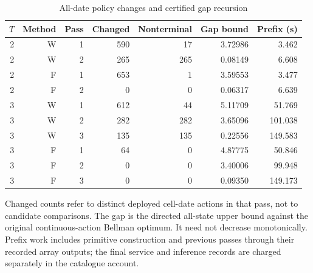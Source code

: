 \begin{table}[htbp]
\centering
\caption{All-date policy changes and certified gap recursion}\label{tab:sweeps54}
{\small\setlength{\tabcolsep}{4pt}
\begin{tabular}{rrr r r r r}
\hline
$T$ & Method & Pass & Changed & Nonterminal & Gap bound & Prefix (s) \\
\hline
2 & W & 1 & 590 & 17 & 3.72986 & 3.462 \\
2 & W & 2 & 265 & 265 & 0.08149 & 6.608 \\
2 & F & 1 & 653 & 1 & 3.59553 & 3.477 \\
2 & F & 2 & 0 & 0 & 0.06317 & 6.639 \\
3 & W & 1 & 612 & 44 & 5.11709 & 51.769 \\
3 & W & 2 & 282 & 282 & 3.65096 & 101.038 \\
3 & W & 3 & 135 & 135 & 0.22556 & 149.583 \\
3 & F & 1 & 64 & 0 & 4.87775 & 50.846 \\
3 & F & 2 & 0 & 0 & 3.40006 & 99.948 \\
3 & F & 3 & 0 & 0 & 0.09350 & 149.173 \\
\hline
\end{tabular}}
\par\smallskip
{\footnotesize Changed counts refer to distinct deployed cell-date actions in that pass, not to candidate comparisons. The gap is the directed all-state upper bound against the original continuous-action Bellman optimum. It need not decrease monotonically. Prefix work includes primitive construction and previous passes through their recorded array outputs; the final service and inference records are charged separately in the catalogue account.}
\end{table}
